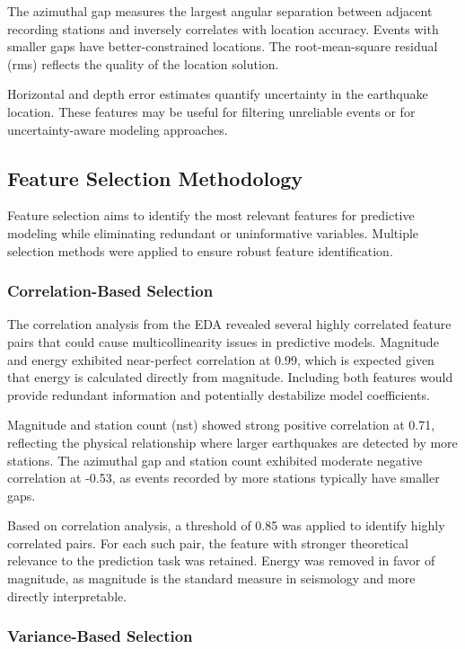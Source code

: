 The azimuthal gap measures the largest angular separation between adjacent recording stations and inversely correlates with location accuracy. Events with smaller gaps have better-constrained locations. The root-mean-square residual (rms) reflects the quality of the location solution.

Horizontal and depth error estimates quantify uncertainty in the earthquake location. These features may be useful for filtering unreliable events or for uncertainty-aware modeling approaches.

\subsection{Feature Selection Methodology}

Feature selection aims to identify the most relevant features for predictive modeling while eliminating redundant or uninformative variables. Multiple selection methods were applied to ensure robust feature identification.

\subsubsection{Correlation-Based Selection}

The correlation analysis from the EDA revealed several highly correlated feature pairs that could cause multicollinearity issues in predictive models. Magnitude and energy exhibited near-perfect correlation at 0.99, which is expected given that energy is calculated directly from magnitude. Including both features would provide redundant information and potentially destabilize model coefficients.

Magnitude and station count (nst) showed strong positive correlation at 0.71, reflecting the physical relationship where larger earthquakes are detected by more stations. The azimuthal gap and station count exhibited moderate negative correlation at -0.53, as events recorded by more stations typically have smaller gaps.

Based on correlation analysis, a threshold of 0.85 was applied to identify highly correlated pairs. For each such pair, the feature with stronger theoretical relevance to the prediction task was retained. Energy was removed in favor of magnitude, as magnitude is the standard measure in seismology and more directly interpretable.

\subsubsection{Variance-Based Selection}

